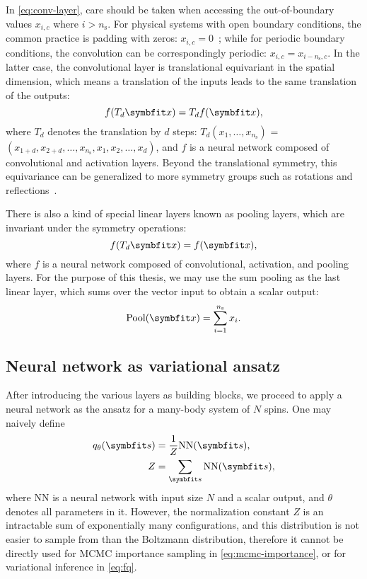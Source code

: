 In \cref{eq:conv-layer}, care should be taken when accessing the out-of-boundary values $x_{i, c}$ where $i > n_\text{s}$. For physical systems with open boundary conditions, the common practice is padding with zeros: $x_{i, c} = 0$~\cite{islam2020much}; while for periodic boundary conditions, the convolution can be correspondingly periodic: $x_{i, c} = x_{i - n_\text{s}, c}$. In the latter case, the convolutional layer is translational equivariant in the spatial dimension, which means a translation of the inputs leads to the same translation of the outputs:
\begin{equation}
f(T_d \vx) = T_d f(\vx),
\end{equation}
where $T_d$ denotes the translation by $d$ steps: $T_d (x_1, \ldots, x_{n_\text{s}})$ = $(x_{1 + d}, x_{2 + d}, \ldots, x_{n_\text{s}}, x_1, x_2, \ldots, x_d)$, and $f$ is a neural network composed of convolutional and activation layers. Beyond the translational symmetry, this equivariance can be generalized to more symmetry groups such as rotations and reflections~\cite{roth2021group}.

There is also a kind of special linear layers known as pooling layers, which are invariant under the symmetry operations:
\begin{equation}
f(T_d \vx) = f(\vx),
\label{eq:trans-invar}
\end{equation}
where $f$ is a neural network composed of convolutional, activation, and pooling layers. For the purpose of this thesis, we may use the sum pooling as the last linear layer, which sums over the vector input to obtain a scalar output:
\begin{equation}
\text{Pool}(\vx) = \sum_{i = 1}^{n_\text{s}} x_i.
\end{equation}

\subsection{Neural network as variational ansatz}

After introducing the various layers as building blocks, we proceed to apply a neural network as the ansatz for a many-body system of $N$ spins. One may naively define
\begin{align}
q_\theta(\vs) &= \frac{1}{Z} \text{NN}(\vs), \\
Z &= \sum_\vs \text{NN}(\vs),
\end{align}
where NN is a neural network with input size $N$ and a scalar output, and $\theta$ denotes all parameters in it. However, the normalization constant $Z$ is an intractable sum of exponentially many configurations, and this distribution is not easier to sample from than the Boltzmann distribution, therefore it cannot be directly used for MCMC importance sampling in \cref{eq:mcmc-importance}, or for variational inference in \cref{eq:fq}.

